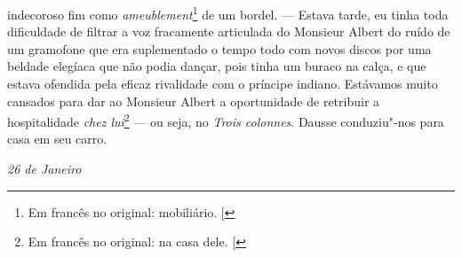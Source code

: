 indecoroso fim como \emph{ameublement}\footnote{Em francês no original: mobiliário. {[}\versal{N.~T.}{]}} de um bordel. --- Estava tarde, eu
tinha toda dificuldade de filtrar a voz fracamente articulada do
Monsieur Albert do ruído de um gramofone que era suplementado o tempo
todo com novos discos por uma beldade elegíaca que não podia dançar, pois
tinha um buraco na calça, e que estava ofendida pela eficaz rivalidade
com o príncipe indiano. Estávamos muito cansados para dar ao Monsieur
Albert a oportunidade de retribuir a hospitalidade \emph{chez lui}\footnote{Em francês no original: na casa dele. {[}\versal{N.~T.}{]}} --- ou
seja, no \emph{Trois colonnes}. Dausse conduziu"-nos para casa em seu carro.

\begin{flushright}
\emph{26 de Janeiro}
\end{flushright}

